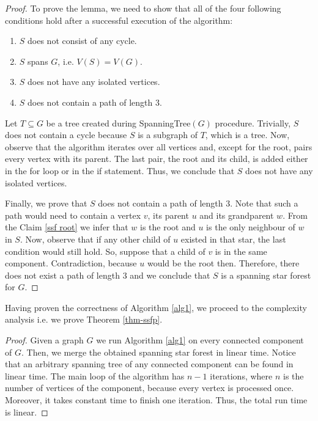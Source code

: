 \documentclass[en]{pracamgr}
\theoremstyle{definition}
\newcommand{\ssf}{spanning star forest}
\begin{document}
\begin{proof}
	To prove the lemma, we need to show that all of the four following conditions hold after a successful execution of the algorithm:
	\begin{enumerate}
		\item $S$ does not consist of any cycle.
		\item $S$ spans $G$, i.e. $V(S) = V(G)$.
		\item $S$ does not have any isolated vertices.
		\item $S$ does not contain a path of length $3$.
	\end{enumerate}
	Let $T \subseteq G$ be a tree created during \textrm{SpanningTree}$(G)$ procedure. Trivially, $S$ does not contain a cycle because $S$ is a subgraph of $T$, which is a tree. Now, observe that the algorithm iterates over all vertices and, except for the root, pairs every vertex with its parent. The last pair, the root and its child, is added either in the for loop or in the if statement. Thus, we conclude that $S$ does not have any isolated vertices. 
	
	Finally, we prove that $S$ does not contain a path of length $3$. Note that such a path would need to contain a vertex $v$, its parent $u$ and its grandparent $w$. From the Claim \ref{ssf root} we infer that $w$ is the root and $u$ is the only neighbour of $w$ in $S$. Now, observe that if any other child of $u$ existed in that star, the last condition would still hold. So, suppose that a child of $v$ is in the same component. Contradiction, because $u$ would be the root then.
	Therefore, there does not exist a path of length $3$ and we conclude that $S$ is a spanning star forest for $G$. 
\end{proof}

Having proven the correctness of Algorithm \ref{alg1}, we proceed to the complexity analysis i.e. we prove Theorem \ref{thm-ssfp}.

\thmssfp*

\begin{proof}
	Given a graph $G$ we run Algorithm \ref{alg1} on every connected component of $G$. Then, we  merge the obtained \ssf{} in linear time. Notice that an arbitrary spanning tree of any connected component can be found in linear time. The main loop of the algorithm has $n-1$ iterations, where $n$ is the number of vertices of the component, because every vertex is processed once. Moreover, it takes constant time to finish one iteration. Thus, the total run time is linear.
\end{proof}
\end{document}
